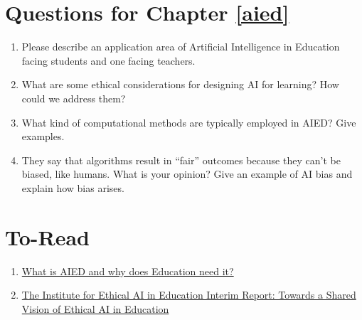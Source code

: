 \documentclass[
]{book}
\providecommand{\tightlist}{%
  \setlength{\itemsep}{0pt}\setlength{\parskip}{0pt}}
\begin{document}
\section{Questions for Chapter \ref{aied}}\label{questions-for-chapter-refaied}

\begin{enumerate}
\def\labelenumi{\arabic{enumi}.}
\tightlist
\item
  Please describe an application area of Artificial Intelligence in Education facing students and one facing teachers.
\item
  What are some ethical considerations for designing AI for learning? How could we address them?
\item
  What kind of computational methods are typically employed in AIED? Give examples.
\item
  They say that algorithms result in ``fair'' outcomes because they can't be biased, like humans. What is your opinion? Give an example of AI bias and explain how bias arises.
\end{enumerate}

\section{To-Read}\label{to-read-4}

\begin{enumerate}
\def\labelenumi{\arabic{enumi}.}
\tightlist
\item
  \href{https://www.researchgate.net/publication/241698223_What_is_AIED_and_why_does_Education_need_it}{What is AIED and why does Education need it?}
\item
  \href{https://www.buckingham.ac.uk/wp-content/uploads/2020/02/Summary-The-Institute-for-Ethical-AI-in-Educations-Interim-Report-Towards-a-Shared-Vision-of-Ethical-AI-in-Education.pdf}{The Institute for Ethical AI in Education Interim Report: Towards a Shared Vision of Ethical AI in Education}
\end{enumerate}

  
\end{document}
